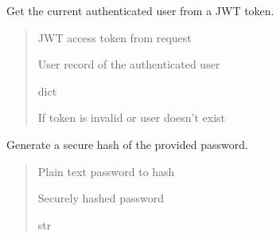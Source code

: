 \documentclass[letterpaper,10pt,openany,oneside,english]{sphinxmanual}
\begin{document}

\begin{savenotes}\begin{fulllineitems}
\label{\detokenize{modules/security:storeapi.security.get_current_user}}
\pysigstartsignatures
{}
\pysigstopsignatures
\sphinxAtStartPar
Get the current authenticated user from a JWT token.
\begin{quote}\begin{description}
\sphinxAtStartPar
{} \textendash{} JWT access token from request

\sphinxAtStartPar
User record of the authenticated user

\sphinxAtStartPar
dict

\sphinxAtStartPar
{} \textendash{} If token is invalid or user doesn’t exist

\end{description}\end{quote}

\end{fulllineitems}\end{savenotes}


\begin{savenotes}\begin{fulllineitems}
\label{\detokenize{modules/security:storeapi.security.get_password_hash}}
\pysigstartsignatures
{}
\pysigstopsignatures
\sphinxAtStartPar
Generate a secure hash of the provided password.
\begin{quote}\begin{description}
\sphinxAtStartPar
{} \textendash{} Plain text password to hash

\sphinxAtStartPar
Securely hashed password

\sphinxAtStartPar
str

\end{description}\end{quote}

\end{fulllineitems}\end{savenotes}
\end{document}
